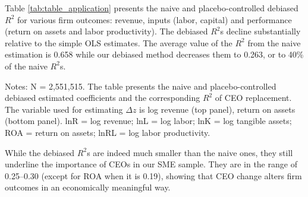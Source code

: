 \documentclass[sigconf,nonacm]{acmart}
\newcommand{\tablepath}{papers/econometrics/table}
\begin{document}
Table \ref{tab:table_application} presents the naive and placebo-controlled debiased $R^2$ for various firm outcomes: revenue, inputs (labor, capital) and performance (return on assets and labor productivity). The debiased $R^2$s decline substantially relative to the simple OLS estimates. The average value of the $R^2$ from the naive estimation is 0.658 while our debiased method decreases them to 0.263, or to 40\% of the naive $R^2$s. 
\begin{table}[t]
    \centering
    \caption{Analysis of Variance -- Naive and Debiased Estimates}
    \vspace{.2cm}
    \label{tab:table_application}
    
    \begin{minipage}{\textwidth}
    \vspace{.2cm}
    \footnotesize{Notes: N = 2,551,515. The table presents the naive and placebo-controlled debiased estimated coefficients and the corresponding $R^2$ of CEO replacement. The variable used for estimating $\Delta z$ is log revenue (top panel), return on assets (bottom panel). lnR = log revenue; lnL = log labor; lnK = log tangible assets; ROA = return on assets; lnRL = log labor productivity.}
    \end{minipage}
\end{table}

While the debiased $R^2$s are indeed much smaller than the naive ones, they still underline the importance of CEOs in our SME sample. They are in the range of 0.25--0.30 (except for ROA when it is 0.19), showing that CEO change alters firm outcomes in an economically meaningful way.

\end{document}
